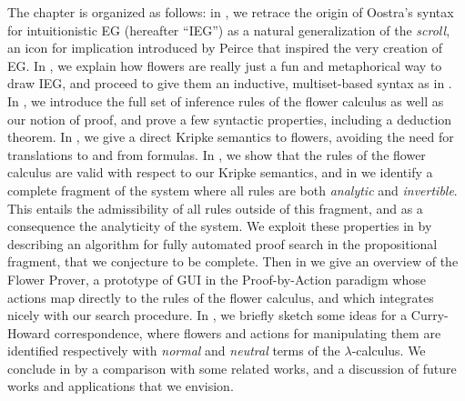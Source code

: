 The chapter is organized as follows: in , we retrace the origin of
Oostra's syntax for intuitionistic EG (hereafter ``IEG'') as a natural
generalization of the \emph{scroll}, an icon for implication introduced by
Peirce that inspired the very creation of EG. In , we explain
how flowers are really just a fun and metaphorical way to draw IEG, and proceed
to give them an inductive, multiset-based syntax as in . In
, we introduce the full set of inference rules of the flower
calculus as well as our notion of proof, and prove a few syntactic properties,
including a deduction theorem. In , we give a direct Kripke
semantics to flowers, avoiding the need for translations to and from formulas.
In , we show that the rules of the flower calculus are valid
with respect to our Kripke semantics, and in  we identify a
complete fragment of the system where all rules are both \emph{analytic} and
\emph{invertible}. This entails the admissibility of all rules outside of this
fragment, and as a consequence the analyticity of the system. We exploit these
properties in  by describing an algorithm for fully
automated proof search in the propositional fragment, that we conjecture to be
complete. Then in  we give an overview of the Flower
Prover, a prototype of GUI in the Proof-by-Action paradigm whose actions map
directly to the rules of the flower calculus, and which integrates nicely with
our search procedure. In , we briefly sketch some
ideas for a Curry-Howard correspondence, where flowers and actions for
manipulating them are identified respectively with \emph{normal} and
\emph{neutral} terms of the $\lambda$-calculus. We conclude in
 by a comparison with some related works, and a discussion of
future works and applications that we envision.




